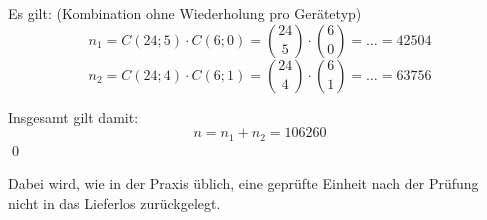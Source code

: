 \documentclass{abgabe}
\begin{document}
\begin{questions}
\begin{parts}
\begin{solution}
            Es gilt: (Kombination ohne Wiederholung pro Gerätetyp)
            \[ 
                n_1 = C(24;5) \cdot C(6;0) = \binom{24}{5} \cdot \binom{6}{0} = \ldots = \num{42504}
            \] 
            \[ 
                n_2 = C(24;4) \cdot C(6;1) = \binom{24}{4} \cdot \binom{6}{1} = \ldots = \num{63756}
            \] 

            Insgesamt gilt damit:
            \[ 
                n = n_1 + n_2 = \num{106260}
            \]
            \qed
        \end{solution}
    \end{parts}

    Dabei wird, wie in der Praxis üblich, eine geprüfte Einheit nach der Prüfung nicht in das Lieferlos zurückgelegt.
\end{questions}
\end{document}
